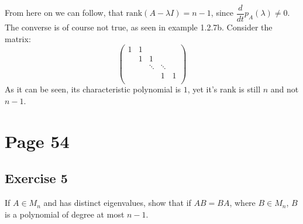 From here on we can follow, that $\text{rank} (A- \lambda I) = n-1$, since $\dfrac{d}{dt} p_{A}(\lambda) \neq 0$.
The converse is of course not true, as seen in example 1.2.7b. Consider the matrix:
\begin{equation}
\left( \begin{array}{ccccc}
1&1 & & &  \\
& 1&1 & & \\
& & \ddots& \ddots & \\
& &  & 1 & 1\\
\end{array} \right)
\end{equation}
As it can be seen, its characteristic polynomial is $1$, yet it's rank is still $n$ and not $n-1$.
\section{Page 54}
\subsection{Exercise 5}
If $A \in M_n$ and has distinct eigenvalues, show that if $AB = BA$, where $B \in M_n$, $B$ is a polynomial of degree at most $n-1$.
